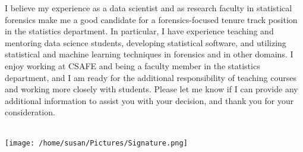 \documentclass[12pt, letterpaper, sans]{moderncv}
\makeatletter
\renewcommand*{\makeletterclosing}{
  \vspace{1em}\@closing\\%
  \hspace{-1em}\texttt{[image: /home/susan/Pictures/Signature.png]}\\%
  {\bfseries \@firstname~\@lastname}%
  \ifthenelse{\isundefined{\@enclosure}}{}{%
    \\%
    \vfill%
    {\color{color2}\itshape\enclname: \@enclosure}}}
\makeatother
\begin{document}
I believe my experience as a data scientist and as research faculty in statistical forensics make me a good candidate for a forensics-focused tenure track position in the statistics department. In particular, I have experience teaching and mentoring data science students, developing statistical software, and utilizing statistical and machine learning techniques in forensics and in other domains. I enjoy working at CSAFE and being a faculty member in the statistics department, and I am ready for the additional responsibility of teaching courses and working more closely with students. Please let me know if I can provide any additional information to assist you with your decision, and thank you for your consideration.  






\makeletterclosing
\end{document}
